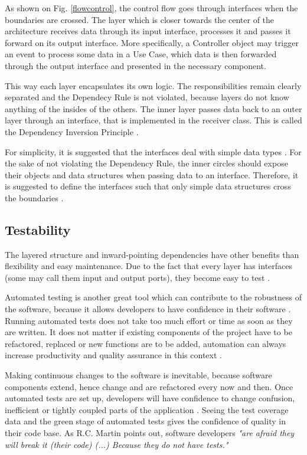 \documentclass[conference]{IEEEtran}
\begin{document}
As shown on Fig. \ref{flowcontrol}, the control flow goes through interfaces when the boundaries are crossed. The layer which is closer towards the center of the architecture receives data through its input interface, processes it and passes it forward on its output interface. More specifically, a Controller object may trigger an event to process some data in a Use Case, which data is then forwarded through the output interface and presented in the necessary component. 

This way each layer encapsulates its own logic. The responsibilities remain clearly separated and the Dependecy Rule is not violated, because layers do not know anything of the insides of the others. The inner layer passes data back to an outer layer through an interface, that is implemented in the receiver class. This is called the Dependency Inversion Principle \cite{cleanarchitecture} \cite{onionarchitecture}. 

For simplicity, it is suggested that the interfaces deal with simple data types \cite{cleanarchitecture}. For the sake of not violating the Dependency Rule, the inner circles should expose their objects and data structures when passing data to an interface. Therefore, it is suggested to define the interfaces such that only simple data structures cross the boundaries \cite{cleanarchitecture}. 

\subsection{Testability}
The layered structure and inward-pointing dependencies have other benefits than flexibility and easy maintenance. Due to the fact that every layer has interfaces (some may call them input and output ports), they become easy to test \cite{cleanarchitecture}. 

Automated testing is another great tool which can contribute to the robustness of the software, because it allows developers to have confidence in their software \cite{cleancoder}. Running automated tests does not take too much effort or time as soon as they are written. It does not matter if existing components of the project have to be refactored, replaced or new functions are to be added, automation can always increase productivity and quality assurance in this context \cite{cleancode}. 

Making continuous changes to the software is inevitable, because software components extend, hence change and are refactored every now and then. Once automated tests are set up, developers will have confidence to change confusion, inefficient or tightly coupled parts of the application \cite{cleancoder}. Seeing the test coverage data and the green stage of automated tests gives the confidence of quality in their code base. As R.C. Martin points out, software developers  \textit{"are afraid they will break it (their code) (...) Because they do not have tests."} \cite{cleancoder}
\end{document}
